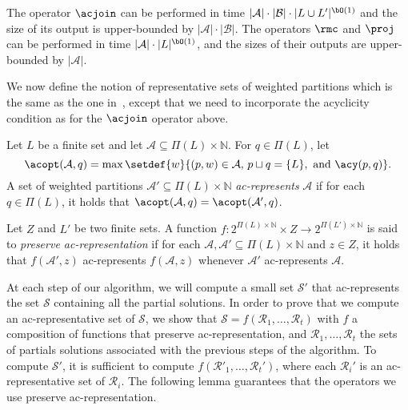 \begin{toappendix}
\begin{proposition}\label{prop:op}
    The operator $\acjoin$ can be performed in time $|\mathcal{A}| \cdot |\mathcal{B}| \cdot |L \cup L'|^{\bO(1)}$
    and the size of its output is upper-bounded by $|\mathcal{A}| \cdot |\mathcal{B}|$.
    The operators $\rmc$ and $\proj$ can be performed in time $|\mathcal{A}| \cdot |L|^{\bO(1)}$,
    and the sizes of their outputs are upper-bounded by $|\mathcal{A}|$.
\end{proposition}

We now define the notion of representative sets of weighted partitions which is the same as the one in~\cite{iandc/BodlaenderCKN15},
except that we need to incorporate the acyclicity condition as for the $\acjoin$ operator above.


\begin{definition}\label{defn:par-rep}
    Let $L$ be a finite set and let $\mathcal{A} \subseteq \Pi(L) \times \mathbb{N}$.
    For $q \in \Pi(L)$, let
    \[
        \acopt(\mathcal{A},q) = \max \setdef{w}{(p,w) \in \mathcal{A}, \, p \sqcup q = \{L\}, \textrm{ and } \acy(p,q)}.
    \]
    A set of weighted partitions $\mathcal{A}' \subseteq \Pi(L) \times \mathbb{N}$ \emph{ac-represents} $\mathcal{A}$ if
    for each $q \in \Pi(L)$, it holds that $\acopt(\mathcal{A},q)=\acopt(\mathcal{A}',q)$.

    Let $Z$ and $L'$ be two finite sets.
    A function $f \colon 2^{\Pi(L) \times \mathbb{N}} \times Z \to 2^{\Pi(L') \times \mathbb{N}}$ is said to
    \emph{preserve ac-representation} if for each
    $\mathcal{A},\mathcal{A}' \subseteq \Pi(L) \times \mathbb{N}$ and $z \in Z$,
    it holds that $f(\mathcal{A}',z)$ ac-represents $f(\mathcal{A},z)$ whenever $\mathcal{A}'$ ac-represents $\mathcal{A}$.
\end{definition}


At each step of our algorithm, we will compute a small set $\mathcal{S}'$ that ac-represents the set $\mathcal{S}$ containing all the partial solutions.
In order to prove that we compute an ac-representative set of $\mathcal{S}$,
we show that $\mathcal{S} = f(\mathcal{R}_1,\ldots,\mathcal{R}_t)$ with $f$ a composition of functions that preserve ac-representation,
and $\mathcal{R}_1,\ldots,\mathcal{R}_t$ the sets of partials solutions associated with the previous steps of the algorithm.
To compute $\mathcal{S}'$, it is sufficient to compute $f(\mathcal{R}'_1,\ldots,\mathcal{R}_t')$,
where each $\mathcal{R}_i'$ is an ac-representative set of $\mathcal{R}_i$.
The following lemma guarantees that the operators we use preserve ac-representation.


\end{toappendix}
